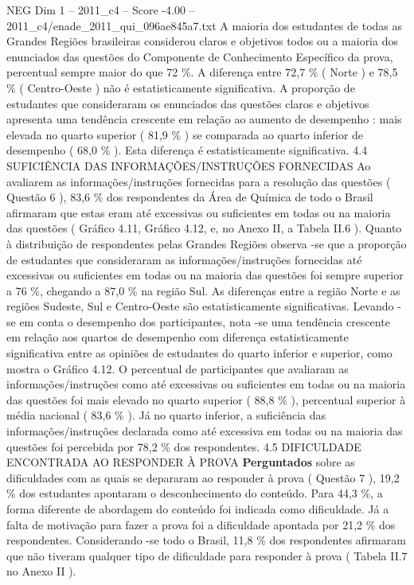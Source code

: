 \begin{textsample}{NEG Dim 1 – 2011\_c4 – Score -4.00 – 2011\_c4/enade\_2011\_qui\_096ae845a7.txt}
A maioria dos estudantes de todas as Grandes Regiões brasileiras considerou claros e objetivos todos ou a maioria dos enunciados das questões do Componente de Conhecimento Específico da prova, percentual sempre maior do que 72 \%.
A diferença entre 72,7 \% ( Norte ) e 78,5 \% ( Centro-Oeste ) não é estatisticamente significativa.
A proporção de estudantes que consideraram os enunciados das questões claros e objetivos apresenta uma tendência crescente em relação ao aumento de desempenho : mais elevada no quarto superior ( 81,9 \% ) se comparada ao quarto inferior de desempenho ( 68,0 \% ).
Esta diferença é estatisticamente significativa. 4.4 SUFICIÊNCIA DAS INFORMAÇÕES/INSTRUÇÕES FORNECIDAS Ao avaliarem as informações/instruções fornecidas para a resolução das questões ( Questão 6 ), 83,6 \% dos respondentes da Área de Química de todo o Brasil afirmaram que estas eram até excessivas ou suficientes em todas ou na maioria das questões ( Gráfico 4.11, Gráfico 4.12, e, no Anexo II, a Tabela II.6 ).
Quanto à distribuição de respondentes pelas Grandes Regiões observa -se que a proporção de estudantes que consideraram as informações/instruções fornecidas até excessivas ou suficientes em todas ou na maioria das questões foi sempre superior a 76 \%, chegando a 87,0 \% na região Sul.
As diferenças entre a região Norte e as regiões Sudeste, Sul e Centro-Oeste são estatisticamente significativas.
Levando -se em conta o desempenho dos participantes, nota -se uma tendência crescente em relação aos quartos de desempenho com diferença estatisticamente significativa entre as opiniões de estudantes do quarto inferior e superior, como mostra o Gráfico 4.12.
O percentual de participantes que avaliaram as informações/instruções como até excessivas ou suficientes em todas ou na maioria das questões foi mais elevado no quarto superior ( 88,8 \% ), percentual superior à média nacional ( 83,6 \% ).
Já no quarto inferior, a suficiência das informações/instruções declarada como até excessiva em todas ou na maioria das questões foi percebida por 78,2 \% dos respondentes. 4.5 DIFICULDADE ENCONTRADA AO RESPONDER À PROVA \textbf{Perguntados} sobre as dificuldades com as quais se depararam ao responder à prova ( Questão 7 ), 19,2 \% dos estudantes apontaram o desconhecimento do conteúdo.
Para 44,3 \%, a forma diferente de abordagem do conteúdo foi indicada como dificuldade.
Já a falta de motivação para fazer a prova foi a dificuldade apontada por 21,2 \% dos respondentes.
Considerando -se todo o Brasil, 11,8 \% dos respondentes afirmaram que não tiveram qualquer tipo de dificuldade para responder à prova ( Tabela II.7 no Anexo II ).

\end{textsample}
